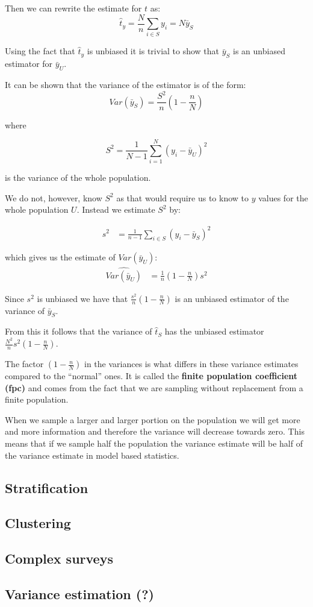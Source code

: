 \documentclass{article}
\begin{document}
Then we can rewrite the estimate for $t$ as:
\begin{equation*}
\hat{t}_y = \frac{N}{n} \sum_{i \in S} y_i = N\bar{y}_S
\end{equation*}

Using the fact that $\hat{t}_y$ is unbiased it is trivial to show that
$\bar{y}_S$ is an unbiased estimator for $\bar{y}_U$.

It can be shown that the variance of the estimator is of the form:
\begin{equation*}
Var \left( \bar{y}_S \right) = \frac{S^2}{n} \left( 1 - \frac{n}{N}
\right)
\end{equation*}

where

\begin{equation*}
S^2 = \frac{1}{N - 1} \sum_{i = 1}^N (y_i - \bar{y}_U)^2
\end{equation*}

is the variance of the whole population.

We do not, however, know $S^2$ as that would require us to know to $y$ values
for the whole population $U$. Instead we estimate $S^2$ by:

\begin{align*}
  s^2
  &= \frac{1}{n - 1} \sum_{i \in S} \left( y_i - \bar{y}_S \right)^2
\end{align*}

which gives us the estimate of $Var(\bar{y}_U)$:
\begin{align*}
  \widehat{Var(\bar{y}_U)}
  &= \frac{1}{n} \left( 1 - \frac{n}{N} \right) s^2
\end{align*}

Since $s^2$ is unbiased we have that $\frac{s^2}{n} \left( 1 - \frac{n}{N}
\right)$ is an unbiased estimator of the variance of $\bar{y}_S$.

From this it follows that the variance of $\hat{t}_S$ has the unbiased estimator
$\frac{N^2}{n} s^2 \left( 1 - \frac{n}{N} \right)$.

The factor $\left( 1 - \frac{n}{N} \right)$ in the variances is what differs in
these variance estimates compared to the ``normal'' ones. It is called the
\textbf{finite population coefficient (fpc)} and comes from the fact that we are
sampling without replacement from a finite population.

When we sample a larger and larger portion on the population we will get more
and more information and therefore the variance will decrease towards zero. This
means that if we sample half the population the variance estimate will be half
of the variance estimate in model based statistics.


\subsection{Stratification}

\subsection{Clustering}

\subsection{Complex surveys}

\subsection{Variance estimation (?)}
\end{document}
